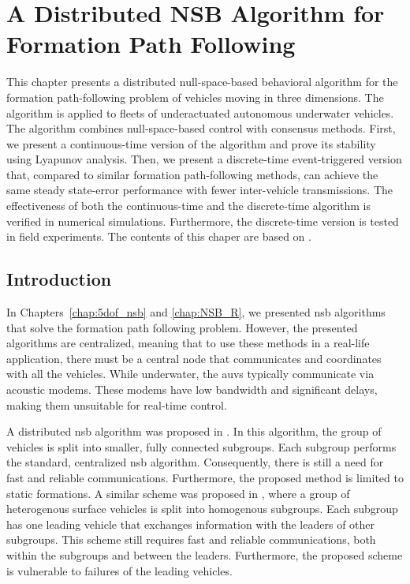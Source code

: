 \chapter{A Distributed NSB Algorithm for Formation Path Following}
\label{chap:distr_NSB}

This chapter presents a distributed null-space-based behavioral algorithm for the formation path-following problem of vehicles moving in three dimensions.
The algorithm is applied to fleets of underactuated autonomous underwater vehicles.
The algorithm combines null-space-based control with consensus methods.
First, we present a continuous-time version of the algorithm and prove its stability using Lyapunov analysis.
Then, we present a discrete-time event-triggered version that, compared to similar formation path-following methods, can achieve the same steady state-error performance with fewer inter-vehicle transmissions.
The effectiveness of both the continuous-time and the discrete-time algorithm is verified in numerical simulations.
Furthermore, the discrete-time version is tested in field experiments.  
The contents of this chaper are based on \cite{matous_singularity_2023}.

\section{Introduction}

In Chapters~\ref{chap:5dof_nsb} and \ref{chap:NSB_R}, we presented \gls{nsb} algorithms that solve the formation path following problem.
However, the presented algorithms are centralized, meaning that to use these methods in a real-life application, there must be a central node that communicates and coordinates with all the vehicles.
While underwater, the \glspl{auv} typically communicate via acoustic modems.
These modems have low bandwidth and significant delays, making them unsuitable for real-time control.

A distributed \gls{nsb} algorithm was proposed in \cite{ahmad_multirobot_2014}.
In this algorithm, the group of vehicles is split into smaller, fully connected subgroups.
Each subgroup performs the standard, centralized \gls{nsb} algorithm.
Consequently, there is still a need for fast and reliable communications.
Furthermore, the proposed method is limited to static formations.
A similar scheme was proposed in \cite{tan_coordinated_2022}, where a group of heterogenous surface vehicles is split into homogenous subgroups.
Each subgroup has one leading vehicle that exchanges information with the leaders of other subgroups.
This scheme still requires fast and reliable communications, both within the subgroups and between the leaders.
Furthermore, the proposed scheme is vulnerable to failures of the leading vehicles.

